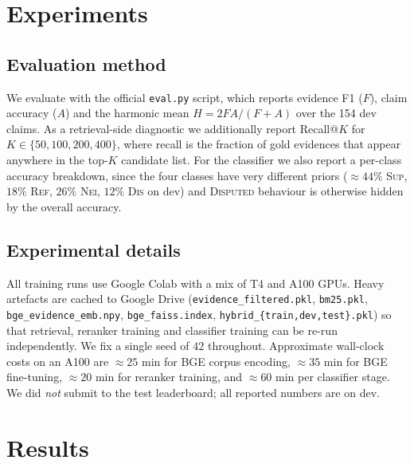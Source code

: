 \documentclass[11pt]{article}
\begin{document}
\section{Experiments}

\subsection{Evaluation method}
We evaluate with the official \texttt{eval.py} script, which reports
evidence F1 ($F$), claim accuracy ($A$) and the harmonic mean
$H = 2FA/(F\!+\!A)$ over the 154 dev claims. As a retrieval-side
diagnostic we additionally report Recall@$K$ for
$K\!\in\!\{50, 100, 200, 400\}$, where recall is the fraction of
gold evidences that appear anywhere in the top-$K$ candidate list.
For the classifier we also report a per-class accuracy breakdown,
since the four classes have very different priors ($\approx 44\%$
\textsc{Sup}, $18\%$ \textsc{Ref}, $26\%$ \textsc{Nei}, $12\%$
\textsc{Dis} on dev) and \textsc{Disputed} behaviour is otherwise
hidden by the overall accuracy.

\subsection{Experimental details}
All training runs use Google Colab with a mix of T4 and A100 GPUs.
Heavy artefacts are cached to Google Drive
(\texttt{evidence\_filtered.pkl}, \texttt{bm25.pkl},
\texttt{bge\_evidence\_emb.npy}, \texttt{bge\_faiss.index},
\texttt{hybrid\_\{train,dev,test\}.pkl}) so that retrieval, reranker
training and classifier training can be re-run independently. We
fix a single seed of $42$ throughout. Approximate wall-clock costs
on an A100 are $\approx 25$ min for BGE corpus encoding, $\approx 35$
min for BGE fine-tuning, $\approx 20$ min for reranker training,
and $\approx 60$ min per classifier stage. We did \emph{not} submit
to the test leaderboard; all reported numbers are on dev.

\section{Results}
\label{sec:results}
\end{document}
